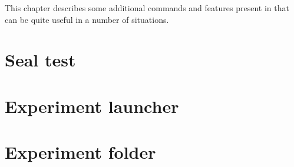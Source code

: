 This chapter describes some additional commands and features present
in \progname that can be quite useful in a number of situations.

\section{Seal test}

\section{Experiment launcher}

\section{Experiment folder} \label{sec:exp_folder}

